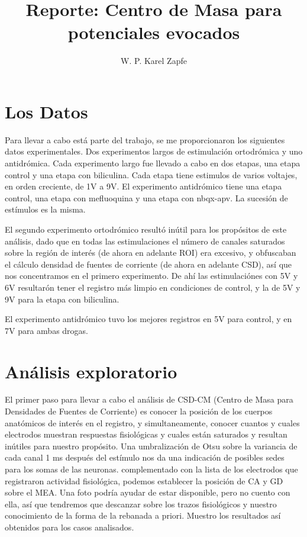 \documentclass{article}
\title{Reporte: Centro de Masa para potenciales evocados}
\author{W. P. Karel Zapfe}
\begin{document}
\maketitle

\section{Los Datos}

Para llevar a cabo está parte del trabajo, se me proporcionaron
los siguientes datos experimentales.
Dos experimentos largos de estimulación ortodrómica y uno
antidrómica. Cada experimento largo fue llevado a cabo
en dos etapas, una etapa control y una etapa con biliculina.
Cada etapa tiene estimulos de varios voltajes, en orden creciente,
de 1V a 9V.
El experimento antidrómico tiene una etapa control, una etapa con
mefluoquina y una etapa con nbqx-apv. La sucesión de estímulos es la misma.

El segundo experimento ortodrómico resultó inútil para los propósitos
de este análisis, dado que en todas las estimulaciones el número de
canales saturados sobre la región de interés (de ahora en adelante ROI)
era excesivo, y obfuscaban el cálculo densidad de fuentes de corriente
(de ahora en adelante CSD), así que nos concentramos en el primero experimento.
De ahí las estimulaciónes con 5V y 6V resultarón tener el registro más
limpio en condiciones de control, y la de 5V y 9V para la etapa
con biliculina.

El experimento antidrómico tuvo los mejores registros en 5V para control,
y en 7V para ambas drogas. 

\section{Análisis exploratorio}

El primer paso para llevar a cabo el análisis de CSD-CM (Centro de Masa
para Densidades de Fuentes de Corriente) es conocer la posición de
los cuerpos anatómicos de interés en el registro, y simultaneamente,
conocer cuantos y cuales electrodos muestran respuestas fisiológicas y
cuales están saturados y resultan inútiles para nuestro propósito.
Una umbralización de Otsu sobre la variancia de cada canal 1 ms después del
estímulo nos da una indicación de posibles sedes para los somas de las neuronas.
complementado con la lista de los electrodos que registraron actividad fisiológica, podemos establecer la posición de CA y GD sobre el MEA. Una foto
podría ayudar de estar disponible, pero no cuento con ella, así que
tendremos que descanzar sobre los trazos fisiológicos y nuestro
conocimiento de la forma de la rebanada a priori. Muestro
los resultados así obtenidos para los casos analisados.
\end{document}
